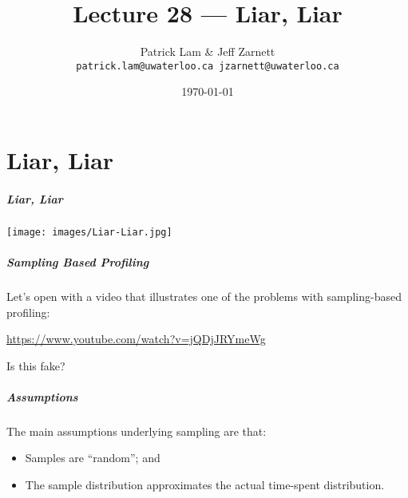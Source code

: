 
\usepackage{soul}

\title{Lecture 28 --- Liar, Liar }

\author{Patrick Lam \& Jeff Zarnett \\ \small \texttt{patrick.lam@uwaterloo.ca jzarnett@uwaterloo.ca}}
\date{\today}




\begin{frame}
  \titlepage
 \end{frame}


\part{Liar, Liar}

\begin{frame}
\frametitle{Liar, Liar}

\begin{center}
	\texttt{[image: images/Liar-Liar.jpg]}
\end{center}


\end{frame}

\begin{frame}
\frametitle{Sampling Based Profiling}

Let's open with a video that illustrates one of the problems with sampling-based profiling:

\begin{center}
	\url{https://www.youtube.com/watch?v=jQDjJRYmeWg}
\end{center}

Is this fake?

\end{frame}


\begin{frame}
\frametitle{Assumptions}

The main assumptions underlying sampling are that:
\vspace*{-6em}
\begin{itemize}
\item Samples are ``random''; and 

\item The sample distribution approximates the actual time-spent distribution.
\end{itemize}

\end{frame}


